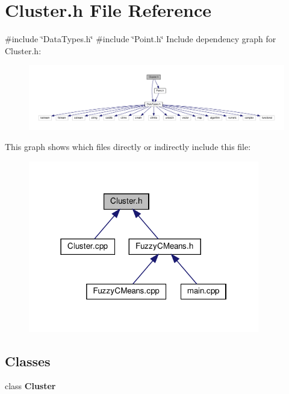 \section{Cluster.\+h File Reference}
\label{_cluster_8h}
{\ttfamily \#include \char`\"{}Data\+Types.\+h\char`\"{}}\newline
{\ttfamily \#include \char`\"{}Point.\+h\char`\"{}}\newline
Include dependency graph for Cluster.\+h\+:
\nopagebreak
\begin{figure}[H]
\begin{center}
\leavevmode
\includegraphics[width=350pt]{_cluster_8h__incl}
\end{center}
\end{figure}
This graph shows which files directly or indirectly include this file\+:
\nopagebreak
\begin{figure}[H]
\begin{center}
\leavevmode
\includegraphics[width=286pt]{_cluster_8h__dep__incl}
\end{center}
\end{figure}
\subsection*{Classes}
\begin{DoxyCompactItemize}
\item 
class \textbf{ Cluster}
\end{DoxyCompactItemize}
